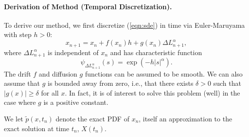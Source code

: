 \documentclass[11pt,letterpaper]{article}
\begin{document}
\paragraph{Derivation of Method (Temporal Discretization).} To derive our method, we first discretize (\ref{eqn:sde}) in time via Euler-Maruyama with step $h > 0$:
\begin{equation}
\label{eqn:em}
x_{n+1} = x_n + f(x_{n}) h + g(x_{n}) \Delta L_{n+1}^{\alpha},
\end{equation}
where $\Delta L_{n+1}^{\alpha}$ is independent of $x_n$ and has characteristic function
\begin{equation}
\label{eqn:emchar}
\psi_{\Delta L^{\alpha}_{n+1}}(s) = \exp(- h |s|^\alpha).
\end{equation}
The drift $f$ and diffusion $g$ functions can be assumed to be smooth.  We can also assume that $g$ is bounded away from zero, i.e., that there exists $\delta > 0$ such that $|g(x)| \geq \delta$ for all $x$.  In fact, it is of interest to solve this problem (well) in the case where $g$ is a positive constant.

We let $\widetilde{p}(x,t_n)$ denote the exact PDF of $x_n$, itself an approximation to the exact solution at time $t_n$, $X(t_n)$.
\end{document}
